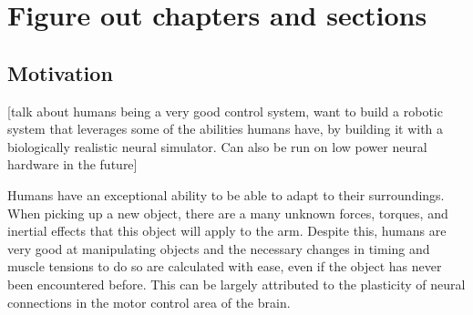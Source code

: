 \documentclass[letterpaper,12pt,titlepage,oneside,final]{book}
\begin{document}
 

\chapter{Figure out chapters and sections}

\section{Motivation}

[talk about humans being a very good control system, want to build a robotic system that leverages some of the abilities humans have, by building it with a biologically realistic neural simulator. Can also be run on low power neural hardware in the future]

Humans have an exceptional ability to be able to adapt to their surroundings. When picking up a new object, there are a many unknown forces, torques, and inertial effects that this object will apply to the arm. Despite this, humans are very good at manipulating objects and the necessary changes in timing and muscle tensions to do so are calculated with ease, even if the object has never been encountered before. This can be largely attributed to the plasticity of neural connections in the motor control area of the brain.
\end{document}

